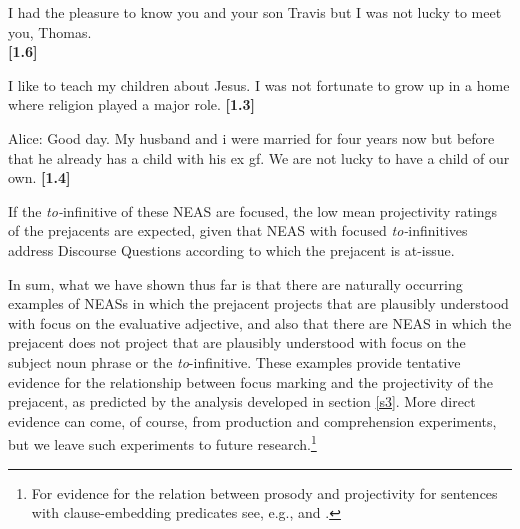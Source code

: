 \documentclass[11pt,fleqn]{article}
\newcommand{\6}{\mbox{$[\hspace*{-.6mm}[$}}
\newcommand{\9}{\mbox{$]\hspace*{-.6mm}]$}}
\begin{document}
\begin{exe}
\ex\label{ex2b}
\begin{xlist}

\ex I had the pleasure to know you and your son Travis  but I was not lucky to meet you, Thomas. \\ \hspace*{.2cm} \hfill {\bf [1.6]}


\ex I like to teach my children about Jesus.  I was not fortunate
to grow up in a home where religion played a major role. \hfill {\bf [1.3]}

\ex Alice: Good day. My husband and i were married for four years now
but before that he already has a child with his ex gf. We are not
lucky to have a child of our own. \hfill {\bf [1.4]}


\end{xlist}

\end{exe}
If the {\em to-}infinitive of these NEAS are focused, the low mean projectivity ratings of the prejacents are expected, given that NEAS with focused {\em to-}infinitives address Discourse Questions according to which the prejacent is at-issue.

In sum, what we have shown thus far is that there are naturally occurring examples of NEASs in which the prejacent projects that are plausibly understood with focus on the evaluative adjective, and also that there are NEAS in which the prejacent does not project that are plausibly understood with focus on the subject noun phrase or the {\em to}-infinitive. These examples provide tentative evidence for the relationship between focus marking and the projectivity of the prejacent, as predicted by the analysis developed in section \ref{s3}. More direct evidence can come, of course, from production and comprehension experiments, but we leave such experiments to future research.\footnote{For evidence for the relation between prosody and projectivity for sentences with clause-embedding predicates see, e.g., \citealt{cummins-rohde2015,tonhauser-salt26} and \citealt{djaerv-bacovcin-salt27}.} 
\end{document}
